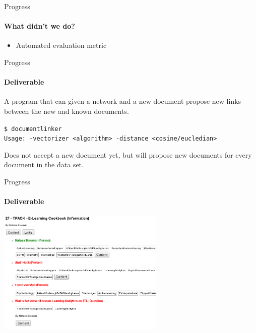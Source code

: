 \begin{frame}[t]{Progress}

\framesubtitle{What didn't we do?}

\begin{itemize}
\item Automated evaluation metric
\end{itemize}

\end{frame}



\begin{frame}[t]{Progress}

\framesubtitle{Deliverable}

A program that can given a network and a new document propose new
links between the new and known documents.

\addvspace{3mm}
{\tt \$ documentlinker\\ Usage: -vectorizer <algorithm> -distance <cosine/eucledian>}

\pause
\addvspace{3mm}
Does not accept a new document yet, but will propose new documents for every
document in the data set.

\end{frame}

\begin{frame}[t]{Progress}

\framesubtitle{Deliverable}
\includegraphics[width=8cm]{viewer}

\end{frame}
